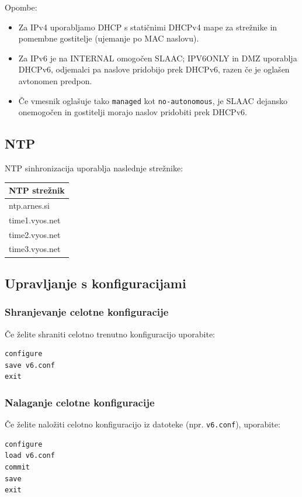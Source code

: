 \documentclass[a4paper,11pt]{article}
\begin{document}
Opombe:
\begin{itemize}
  \item Za IPv4 uporabljamo DHCP s statičnimi DHCPv4 mape za strežnike in pomembne gostitelje (ujemanje po MAC naslovu).
  \item Za IPv6 je na INTERNAL omogočen SLAAC; IPV6ONLY in DMZ uporablja DHCPv6, odjemalci pa naslove pridobijo prek DHCPv6, razen če je oglašen avtonomen predpon.
  \item Če vmesnik oglašuje tako \texttt{managed} kot \texttt{no-autonomous}, je SLAAC dejansko onemogočen in gostitelji morajo naslov pridobiti prek DHCPv6.
\end{itemize}

\subsection{NTP}
NTP sinhronizacija uporablja naslednje strežnike:

\begin{longtable}{|l|}
\hline
\textbf{NTP strežnik} \\
\hline
ntp.arnes.si \\
\hline
time1.vyos.net \\
\hline
time2.vyos.net \\
\hline
time3.vyos.net \\
\hline
\end{longtable}

\subsection{Upravljanje s konfiguracijami}

\subsubsection{Shranjevanje celotne konfiguracije}
Če želite shraniti celotno trenutno konfiguracijo uporabite:
\begin{lstlisting}
configure
save v6.conf
exit
\end{lstlisting}

\subsubsection{Nalaganje celotne konfiguracije}
Če želite naložiti celotno konfiguracijo iz datoteke (npr. \verb|v6.conf|), uporabite:
\begin{lstlisting}
configure
load v6.conf
commit
save
exit
\end{lstlisting}
\end{document}
